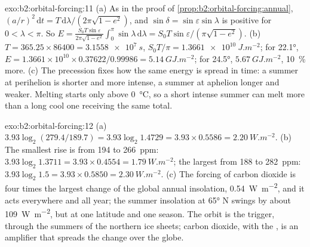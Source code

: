 \begin{solution}{exo:b2:orbital-forcing:11}
(a) As in the proof of \cref{prop:b2:orbital-forcing:annual}, $(a/r)^2\,\mathrm dt =
T\,\mathrm d\lambda/(2\pi\sqrt{1 - e^2})$, and $\sin\delta = \sin\varepsilon\sin\lambda$ is positive
for $0 < \lambda < \pi$. So $E = \frac{S_0T\sin\varepsilon}{2\pi\sqrt{1 - e^2}}\int_0^{\pi}\sin\lambda
\,\mathrm d\lambda = S_0T\sin\varepsilon/(\pi\sqrt{1 - e^2})$. (b) $T = 365.25 \times 86400 =
\qty{3.1558e7}{s}$, $S_0T/\pi = \qty{1.3661e10}{J.m^{-2}}$; for \ang{22.1}, $E = 1.3661 \times 10^{10}
\times 0.37622/0.99986 = \qty{5.14}{GJ.m^{-2}}$; for \ang{24.5}, $\qty{5.67}{GJ.m^{-2}}$,
\qty{10}{\percent} more. (c) The precession fixes how the same energy is spread in time: a summer
at perihelion is shorter and more intense, a summer at aphelion longer and weaker. Melting starts
only above \qty{0}{\celsius}, so a short intense summer can melt more than a long cool one
receiving the same total.
\end{solution}

\begin{solution}{exo:b2:orbital-forcing:12}
(a) $3.93\log_2(279.4/189.7) = 3.93\log_2 1.4729 = 3.93 \times 0.5586 = \qty{2.20}{W.m^{-2}}$. (b) The
smallest rise is from 194 to \qty{266}{ppm}: $3.93\log_2 1.3711 = 3.93 \times 0.4554 =
\qty{1.79}{W.m^{-2}}$; the largest from 188 to \qty{282}{ppm}: $3.93\log_2 1.5 = 3.93 \times 0.5850 =
\qty{2.30}{W.m^{-2}}$. (c) The forcing of carbon dioxide is four times the largest change of the
global annual insolation, \qty{0.54}{W.m^{-2}}, and it acts everywhere and all year; the summer
insolation at \ang{65} N swings by about \qty{109}{W.m^{-2}}, but at one latitude and one season. The
orbit is the trigger, through the summers of the northern ice sheets; carbon dioxide, with the
, is an amplifier that spreads the change over the globe.
\end{solution}

